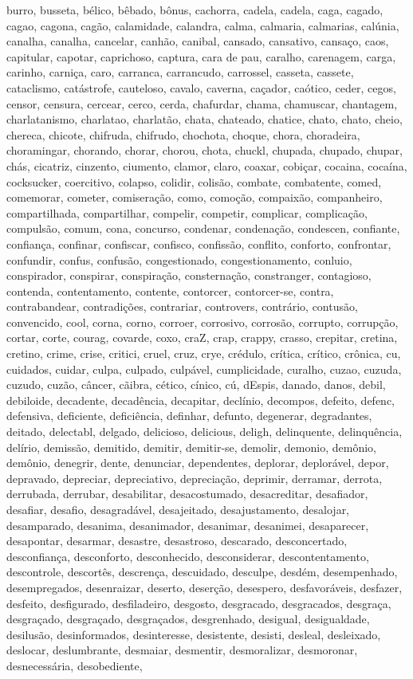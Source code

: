 burro, busseta, bélico, bêbado, bônus, cachorra, cadela, cadela, caga, cagado, cagao, cagona, cagão, calamidade, calandra, calma, calmaria, calmarias, calúnia, canalha, canalha, cancelar, canhão, canibal, cansado, cansativo, cansaço, caos, capitular, capotar, caprichoso, captura, cara de pau, caralho, carenagem, carga, carinho, carniça, caro, carranca, carrancudo, carrossel, casseta, cassete, cataclismo, catástrofe, cauteloso, cavalo, caverna, caçador, caótico, ceder, cegos, censor, censura, cercear, cerco, cerda, chafurdar, chama, chamuscar, chantagem, charlatanismo, charlatao, charlatão, chata, chateado, chatice, chato, chato, cheio, chereca, chicote, chifruda, chifrudo, chochota, choque, chora, choradeira, choramingar, chorando, chorar, chorou, chota, chuckl, chupada, chupado, chupar, chás, cicatriz, cinzento, ciumento, clamor, claro, coaxar, cobiçar, cocaina, cocaína, cocksucker, coercitivo, colapso, colidir, colisão, combate, combatente, comed, comemorar, cometer, comiseração, como, comoção, compaixão, companheiro, compartilhada, compartilhar, compelir, competir, complicar, complicação, compulsão, comum, cona, concurso, condenar, condenação, condescen, confiante, confiança, confinar, confiscar, confisco, confissão, conflito, conforto, confrontar, confundir, confus, confusão, congestionado, congestionamento, conluio, conspirador, conspirar, conspiração, consternação, constranger, contagioso, contenda, contentamento, contente, contorcer, contorcer-se, contra, contrabandear,  contradições, contrariar, controvers, contrário, contusão, convencido, cool, corna, corno, corroer, corrosivo, corrosão, corrupto, corrupção, cortar, corte, courag, covarde, coxo, craZ, crap, crappy, crasso, crepitar, cretina, cretino, crime, crise, critici, cruel, cruz, crye, crédulo, crítica, crítico, crônica, cu, cuidados, cuidar, culpa, culpado, culpável, cumplicidade, curalho, cuzao, cuzuda, cuzudo, cuzão, câncer, cãibra, cético, cínico, cú, dEspis, danado, danos, debil, debiloide, decadente, decadência, decapitar, declínio, decompos, defeito, defenc, defensiva, deficiente, deficiência, definhar, defunto, degenerar, degradantes, deitado, delectabl, delgado, delicioso, delicious, deligh, delinquente, delinquência, delírio, demissão, demitido, demitir, demitir-se, demolir, demonio, demônio, demônio, denegrir, dente, denunciar, dependentes, deplorar, deplorável, depor, depravado, depreciar, depreciativo, depreciação, deprimir, derramar, derrota, derrubada, derrubar, desabilitar, desacostumado, desacreditar, desafiador, desafiar, desafio, desagradável, desajeitado, desajustamento, desalojar, desamparado, desanima, desanimador, desanimar, desanimei, desaparecer, desapontar, desarmar, desastre, desastroso, descarado, desconcertado, desconfiança, desconforto, desconhecido, desconsiderar, descontentamento, descontrole, descortês, descrença, descuidado, desculpe, desdém, desempenhado, desempregados, desenraizar, deserto, deserção, desespero, desfavoráveis, desfazer, desfeito, desfigurado, desfiladeiro, desgosto, desgracado, desgracados, desgraça, desgraçado, desgraçado, desgraçados, desgrenhado, desigual, desigualdade, desilusão, desinformados, desinteresse, desistente, desisti, desleal, desleixado, deslocar, deslumbrante, desmaiar, desmentir, desmoralizar, desmoronar, desnecessária, desobediente, 
